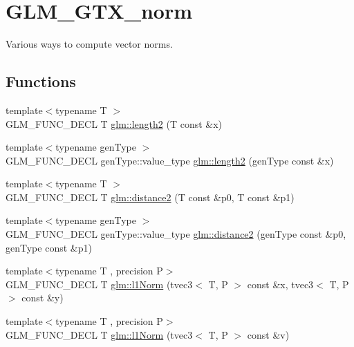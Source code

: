\hypertarget{group__gtx__norm}{}\section{G\+L\+M\+\_\+\+G\+T\+X\+\_\+norm}
\label{group__gtx__norm}


Various ways to compute vector norms.  


\subsection*{Functions}
\begin{DoxyCompactItemize}
\item 
{\footnotesize template$<$typename T $>$ }\\G\+L\+M\+\_\+\+F\+U\+N\+C\+\_\+\+D\+E\+C\+L T \hyperlink{group__gtx__norm_ga08c670024cd230e22f8b853f185ff533}{glm\+::length2} (T const \&x)
\item 
{\footnotesize template$<$typename gen\+Type $>$ }\\G\+L\+M\+\_\+\+F\+U\+N\+C\+\_\+\+D\+E\+C\+L gen\+Type\+::value\+\_\+type \hyperlink{group__gtx__norm_gaa279ba7fdecbed3f9f2b60502b7ec8ca}{glm\+::length2} (gen\+Type const \&x)
\item 
{\footnotesize template$<$typename T $>$ }\\G\+L\+M\+\_\+\+F\+U\+N\+C\+\_\+\+D\+E\+C\+L T \hyperlink{group__gtx__norm_ga3544f6288d3bce2cf2a9f6ebe39e0557}{glm\+::distance2} (T const \&p0, T const \&p1)
\item 
{\footnotesize template$<$typename gen\+Type $>$ }\\G\+L\+M\+\_\+\+F\+U\+N\+C\+\_\+\+D\+E\+C\+L gen\+Type\+::value\+\_\+type \hyperlink{group__gtx__norm_gaec2d9df62436879b48207d39516f3788}{glm\+::distance2} (gen\+Type const \&p0, gen\+Type const \&p1)
\item 
{\footnotesize template$<$typename T , precision P$>$ }\\G\+L\+M\+\_\+\+F\+U\+N\+C\+\_\+\+D\+E\+C\+L T \hyperlink{group__gtx__norm_gaebe5a39b06e262e615622129f37da4f4}{glm\+::l1\+Norm} (tvec3$<$ T, P $>$ const \&x, tvec3$<$ T, P $>$ const \&y)
\item 
{\footnotesize template$<$typename T , precision P$>$ }\\G\+L\+M\+\_\+\+F\+U\+N\+C\+\_\+\+D\+E\+C\+L T \hyperlink{group__gtx__norm_ga6d5964f09cdb43803496a5ee3ced71cb}{glm\+::l1\+Norm} (tvec3$<$ T, P $>$ const \&v)
\item 

\end{DoxyCompactItemize}
